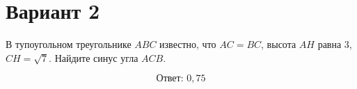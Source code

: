\documentclass[12pt,a4paper]{article}
\begin{document}
\section*{Вариант 2}

В тупоугольном треугольнике \(ABC\) известно, что
\(AC=BC\), высота \(AH\) равна \(3\), \(CH=\sqrt7\).
Найдите синус угла \(ACB\).

\begin{center}\figIsoscelesObtuse\end{center}

\[
\boxed{\text{Ответ: }0{,}75}
\]
\end{document}
